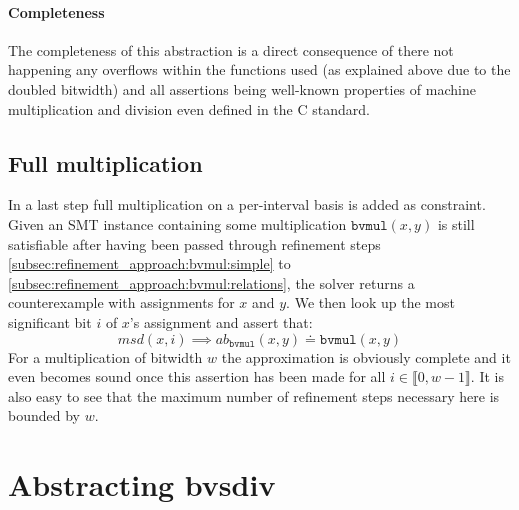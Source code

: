 \paragraph{Completeness}
The completeness of this abstraction is a direct consequence of there not happening any overflows within the functions used (as explained above due to the doubled bitwidth)
and all assertions being well-known properties of machine multiplication and division even defined in the C standard.

\subsection{Full multiplication}
In a last step full multiplication on a per-interval basis is added as constraint.
Given an SMT instance containing some multiplication $\texttt{bvmul}\left(x,y\right)$ is still satisfiable after having been passed through refinement steps
\ref{subsec:refinement_approach:bvmul:simple} to \ref{subsec:refinement_approach:bvmul:relations}, the solver returns a counterexample with assignments for $x$ and $y$.
We then look up the most significant bit $i$ of $x$'s assignment and assert that:
\[
    msd\left(x,i\right) \implies ab_{\texttt{bvmul}}\left(x,y\right) \doteq \texttt{bvmul}\left(x,y\right)
\]
For a multiplication of bitwidth $w$ the approximation is obviously complete and it even becomes sound once this assertion has been made
for all $i\in\llbracket 0,w-1\rrbracket$. It is also easy to see that the maximum number of refinement steps necessary here is bounded by $w$.

\section{Abstracting bvsdiv}
